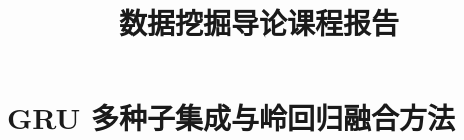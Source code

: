 \documentclass[sigconf,nonacm,screen]{acmart}
\title[数据挖掘导论课程报告]{数据挖掘导论课程报告}
\begin{document}
\maketitle

\section{GRU 多种子集成与岭回归融合方法}
\label{sec:task3-method}






\end{document}
